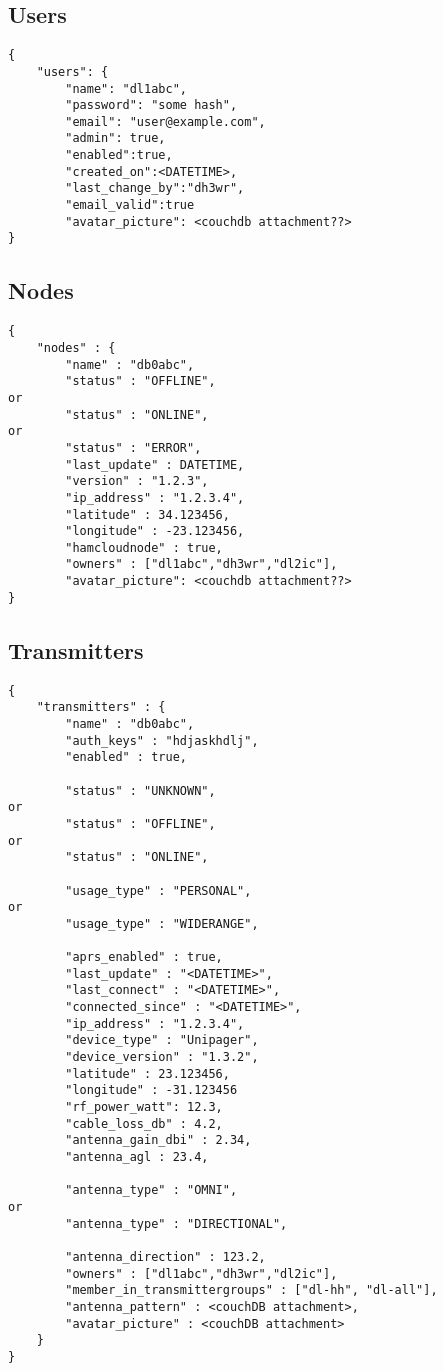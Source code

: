 \documentclass[a4paper]{article}
\begin{document}
\subsection{Users}

\begin{lstlisting}
{
    "users": {
        "name": "dl1abc",
        "password": "some hash",
        "email": "user@example.com",
        "admin": true,
        "enabled":true,
        "created_on":<DATETIME>,
        "last_change_by":"dh3wr",
        "email_valid":true
        "avatar_picture": <couchdb attachment??>
}
\end{lstlisting}

\subsection{Nodes}
\begin{lstlisting}
{
    "nodes" : {
        "name" : "db0abc",
        "status" : "OFFLINE",
or
        "status" : "ONLINE",
or
        "status" : "ERROR",
        "last_update" : DATETIME,
        "version" : "1.2.3",
        "ip_address" : "1.2.3.4",
        "latitude" : 34.123456,
        "longitude" : -23.123456,
        "hamcloudnode" : true,
        "owners" : ["dl1abc","dh3wr","dl2ic"],
        "avatar_picture": <couchdb attachment??>
}
\end{lstlisting}

\subsection{Transmitters}

\begin{lstlisting}
{
    "transmitters" : {
        "name" : "db0abc",
        "auth_keys" : "hdjaskhdlj",
        "enabled" : true,

		"status" : "UNKNOWN",
or
		"status" : "OFFLINE",
or
		"status" : "ONLINE",

		"usage_type" : "PERSONAL",
or
		"usage_type" : "WIDERANGE",
        
        "aprs_enabled" : true,
        "last_update" : "<DATETIME>",
		"last_connect" : "<DATETIME>",
		"connected_since" : "<DATETIME>",
        "ip_address" : "1.2.3.4",
        "device_type" : "Unipager",
        "device_version" : "1.3.2",
        "latitude" : 23.123456,
        "longitude" : -31.123456
        "rf_power_watt": 12.3,
        "cable_loss_db" : 4.2,
        "antenna_gain_dbi" : 2.34,
        "antenna_agl : 23.4,

        "antenna_type" : "OMNI",
or
		"antenna_type" : "DIRECTIONAL",
    
		"antenna_direction" : 123.2,
        "owners" : ["dl1abc","dh3wr","dl2ic"],
        "member_in_transmittergroups" : ["dl-hh", "dl-all"],
        "antenna_pattern" : <couchDB attachment>,
        "avatar_picture" : <couchDB attachment>
    }
}
\end{lstlisting}
\end{document}
